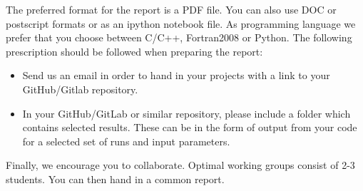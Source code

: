 \documentclass[%
oneside,                 %
final,                   %
10pt]{article}
\begin{document}
The preferred format for the report is a PDF file. You can also use DOC or postscript formats or as an ipython notebook file.  As programming language we prefer that you choose between C/C++, Fortran2008 or Python. The following prescription should be followed when preparing the report:

\begin{itemize}
  \item Send us an email in order  to hand in your projects with a link to your GitHub/Gitlab repository.

  \item In your GitHub/GitLab or similar repository, please include a folder which contains selected results. These can be in the form of output from your code for a selected set of runs and input parameters.
\end{itemize}

\noindent
Finally, 
we encourage you to collaborate. Optimal working groups consist of 
2-3 students. You can then hand in a common report. 


\end{document}
